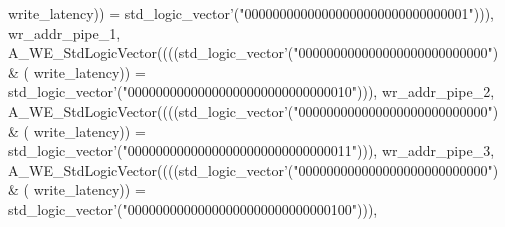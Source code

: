 \begin{DoxyCode}
{      write_latency}\textcolor{vhdlchar}{)}\textcolor{vhdlchar}{)} \textcolor{vhdlchar}{=} \textcolor{comment}{std\_logic\_vector}\textcolor{vhdlchar}{'}\textcolor{vhdlchar}{(}\textcolor{vhdllogic}{"00000000000000000000000000000001"}\textcolor{vhdlchar}{)}\textcolor{vhdlchar}{)}\textcolor{vhdlchar}{)}\textcolor{vhdlchar}{,} \textcolor{vhdlchar}{
      wr_addr_pipe_1}\textcolor{vhdlchar}{,} \textcolor{vhdlchar}{A\_WE\_StdLogicVector}\textcolor{vhdlchar}{(}\textcolor{vhdlchar}{(}\textcolor{vhdlchar}{(}\textcolor{vhdlchar}{(}\textcolor{comment}{std\_logic\_vector}\textcolor{vhdlchar}{'}\textcolor{vhdlchar}{(}\textcolor{vhdllogic}{"000000000000000000000000000"}\textcolor{vhdlchar}{)} \textcolor{vhdlchar}{&} \textcolor{vhdlchar}{(}\textcolor{vhdlchar}{
      write_latency}\textcolor{vhdlchar}{)}\textcolor{vhdlchar}{)} \textcolor{vhdlchar}{=} \textcolor{comment}{std\_logic\_vector}\textcolor{vhdlchar}{'}\textcolor{vhdlchar}{(}\textcolor{vhdllogic}{"00000000000000000000000000000010"}\textcolor{vhdlchar}{)}\textcolor{vhdlchar}{)}\textcolor{vhdlchar}{)}\textcolor{vhdlchar}{,} \textcolor{vhdlchar}{
      wr_addr_pipe_2}\textcolor{vhdlchar}{,} \textcolor{vhdlchar}{A\_WE\_StdLogicVector}\textcolor{vhdlchar}{(}\textcolor{vhdlchar}{(}\textcolor{vhdlchar}{(}\textcolor{vhdlchar}{(}\textcolor{comment}{std\_logic\_vector}\textcolor{vhdlchar}{'}\textcolor{vhdlchar}{(}\textcolor{vhdllogic}{"000000000000000000000000000"}\textcolor{vhdlchar}{)} \textcolor{vhdlchar}{&} \textcolor{vhdlchar}{(}\textcolor{vhdlchar}{
      write_latency}\textcolor{vhdlchar}{)}\textcolor{vhdlchar}{)} \textcolor{vhdlchar}{=} \textcolor{comment}{std\_logic\_vector}\textcolor{vhdlchar}{'}\textcolor{vhdlchar}{(}\textcolor{vhdllogic}{"00000000000000000000000000000011"}\textcolor{vhdlchar}{)}\textcolor{vhdlchar}{)}\textcolor{vhdlchar}{)}\textcolor{vhdlchar}{,} \textcolor{vhdlchar}{
      wr_addr_pipe_3}\textcolor{vhdlchar}{,} \textcolor{vhdlchar}{A\_WE\_StdLogicVector}\textcolor{vhdlchar}{(}\textcolor{vhdlchar}{(}\textcolor{vhdlchar}{(}\textcolor{vhdlchar}{(}\textcolor{comment}{std\_logic\_vector}\textcolor{vhdlchar}{'}\textcolor{vhdlchar}{(}\textcolor{vhdllogic}{"000000000000000000000000000"}\textcolor{vhdlchar}{)} \textcolor{vhdlchar}{&} \textcolor{vhdlchar}{(}\textcolor{vhdlchar}{
      write_latency}\textcolor{vhdlchar}{)}\textcolor{vhdlchar}{)} \textcolor{vhdlchar}{=} \textcolor{comment}{std\_logic\_vector}\textcolor{vhdlchar}{'}\textcolor{vhdlchar}{(}\textcolor{vhdllogic}{"00000000000000000000000000000100"}\textcolor{vhdlchar}{)}\textcolor{vhdlchar}{)}\textcolor{vhdlchar}{)}\textcolor{vhdlchar}{,} \textcolor{vhdlchar}{
}
\end{DoxyCode}
